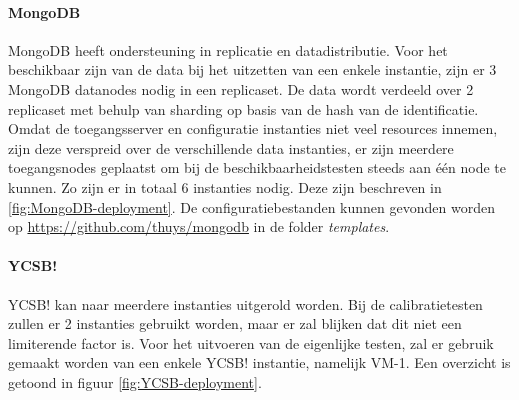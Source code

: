 \paragraph{MongoDB} MongoDB heeft ondersteuning in replicatie en datadistributie. Voor het beschikbaar zijn van de data bij het uitzetten van een enkele instantie, zijn er 3 MongoDB datanodes nodig in een replicaset. De data wordt verdeeld over 2 replicaset met behulp van sharding op basis van de hash van de identificatie. Omdat de toegangsserver en configuratie instanties niet veel resources innemen, zijn deze verspreid over de verschillende data instanties, er zijn meerdere toegangsnodes geplaatst om bij de beschikbaarheidstesten steeds aan één node te kunnen. Zo zijn er in totaal 6 instanties nodig. Deze zijn beschreven in \ref{fig:MongoDB-deployment}. De configuratiebestanden kunnen gevonden worden op \url{https://github.com/thuys/mongodb} in de folder \textit{templates}. 

\paragraph{YCSB!} YCSB! kan naar meerdere instanties uitgerold worden. Bij de calibratietesten zullen er 2 instanties gebruikt worden, maar er zal blijken dat dit niet een limiterende factor is. Voor het uitvoeren van de eigenlijke testen, zal er gebruik gemaakt worden van een enkele YCSB! instantie, namelijk VM-1.  Een overzicht is getoond in figuur \ref{fig:YCSB-deployment}. 

